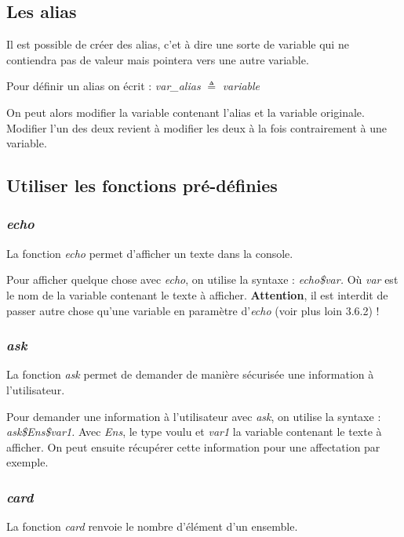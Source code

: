 \documentclass{article}
\begin{document}
\subsection{Les alias}

Il est possible de créer des alias, c'et à dire une sorte de variable qui ne contiendra pas de valeur mais pointera vers une autre variable.

Pour définir un alias on écrit : \textit{var\_alias} $\triangleq$ \textit{variable}

On peut alors modifier la variable contenant l'alias et la variable originale. Modifier l'un des deux revient à modifier les deux à la fois contrairement à une variable.


\subsection{Utiliser les fonctions pré-définies }
\subsubsection{\textit{echo}}
La fonction \textit{echo} permet d'afficher un texte dans la console.

Pour afficher quelque chose avec \textit{echo}, on utilise la syntaxe : \textit{echo\$var.} Où \textit{var} est le nom de la variable contenant le texte à afficher. \textbf{Attention}, il est interdit de passer autre chose qu'une variable en paramètre d'\textit{echo} (voir plus loin 3.6.2) !

\subsubsection{\textit{ask}}

La fonction \textit{ask} permet de demander de manière sécurisée une information à l'utilisateur.

Pour demander une information à l'utilisateur avec \textit{ask}, on utilise la syntaxe : \textit{ask\$Ens\$var1.} Avec \textit{Ens}, le type voulu et \textit{var1} la variable contenant le texte à afficher. On peut ensuite récupérer cette information pour une affectation par exemple.

\subsubsection{\textit{card}}

La fonction \textit{card} renvoie le nombre d'élément d'un ensemble.
\end{document}
